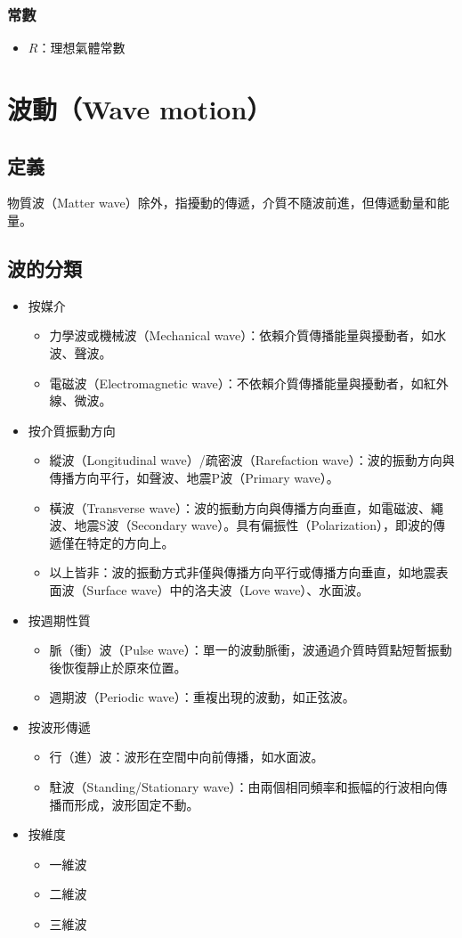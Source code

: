 \documentclass[a4paper,12pt]{report}
\begin{document}
\subsubsection{常數}
\begin{itemize}
\item $R$：理想氣體常數
\end{itemize}


\section{波動（Wave motion）}
\subsection{定義}
物質波（Matter wave）除外，指擾動的傳遞，介質不隨波前進，但傳遞動量和能量。
\subsection{波的分類}
\begin{itemize}
\item 按媒介
\begin{itemize}
\item 力學波或機械波（Mechanical wave）：依賴介質傳播能量與擾動者，如水波、聲波。
\item 電磁波（Electromagnetic wave）：不依賴介質傳播能量與擾動者，如紅外線、微波。
\end{itemize}
\item 按介質振動方向
\begin{itemize}
\item 縱波（Longitudinal wave）/疏密波（Rarefaction wave）：波的振動方向與傳播方向平行，如聲波、地震P波（Primary wave）。
\item 橫波（Transverse wave）：波的振動方向與傳播方向垂直，如電磁波、繩波、地震S波（Secondary wave）。具有偏振性（Polarization），即波的傳遞僅在特定的方向上。
\item 以上皆非：波的振動方式非僅與傳播方向平行或傳播方向垂直，如地震表面波（Surface wave）中的洛夫波（Love wave）、水面波。
\end{itemize}
\item 按週期性質
\begin{itemize}
\item 脈（衝）波（Pulse wave）：單一的波動脈衝，波通過介質時質點短暫振動後恢復靜止於原來位置。
\item 週期波（Periodic wave）：重複出現的波動，如正弦波。
\end{itemize}
\item 按波形傳遞
\begin{itemize}
\item 行（進）波：波形在空間中向前傳播，如水面波。
\item 駐波（Standing/Stationary wave）：由兩個相同頻率和振幅的行波相向傳播而形成，波形固定不動。
\end{itemize}
\item 按維度
\begin{itemize}
\item 一維波
\item 二維波
\item 三維波
\end{itemize}
\end{itemize}
\end{document}
